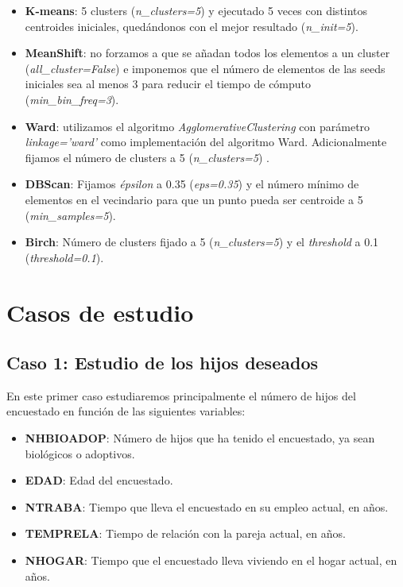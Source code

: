 \documentclass[11pt,a4paper]{article}
\begin{document}
	\begin{itemize}
		\item \textbf{K-means}: 5 clusters (\textit{n\_clusters=5}) y ejecutado 5 veces con distintos centroides iniciales, quedándonos con el mejor resultado (\textit{n\_init=5}).
		\item \textbf{MeanShift}: no forzamos a que se añadan todos los elementos a un cluster (\textit{all\_cluster=False}) e imponemos que el número de elementos de las seeds iniciales sea al menos 3 para reducir el tiempo de cómputo (\textit{min\_bin\_freq=3}).
		\item \textbf{Ward}: utilizamos el algoritmo \textit{AgglomerativeClustering} con parámetro \textit{linkage='ward'} como implementación del algoritmo Ward. Adicionalmente fijamos el número de clusters a 5 (\textit{n\_clusters=5}) .
		\item \textbf{DBScan}: Fijamos \emph{épsilon} a 0.35 (\textit{eps=0.35}) y el número mínimo de elementos en el vecindario para que un punto pueda ser centroide a 5 (\textit{min\_samples=5}).
		\item \textbf{Birch}: Número de clusters fijado a 5 (\textit{n\_clusters=5}) y el \emph{threshold} a 0.1 (\textit{threshold=0.1}).
	\end{itemize}
	
	\section{Casos de estudio}
	\subsection{Caso 1: Estudio de los hijos deseados}
	
	En este primer caso estudiaremos principalmente el número de hijos del encuestado en función de las siguientes variables:
	
	\begin{itemize}
		\item \textbf{NHBIOADOP}: Número de hijos que ha tenido el encuestado, ya sean biológicos o adoptivos.
		\item \textbf{EDAD}: Edad del encuestado.
		\item \textbf{NTRABA}: Tiempo que lleva el encuestado en su empleo actual, en años.
		\item \textbf{TEMPRELA}: Tiempo de relación con la pareja actual, en años.
		\item \textbf{NHOGAR}: Tiempo que el encuestado lleva viviendo en el hogar actual, en años.
	\end{itemize}
\end{document}
